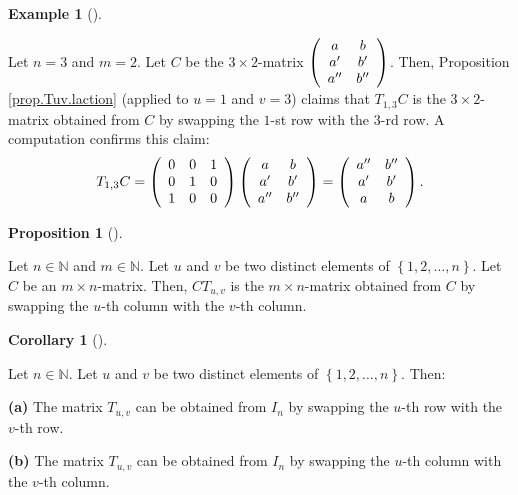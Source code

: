 \documentclass[numbers=enddot,12pt,final,onecolumn,notitlepage]{scrartcl}%
\theoremstyle{definition}
\newtheorem{prop}[theo]{Proposition}
\newenvironment{proposition}[1][]
{\begin{prop}[#1]\begin{leftbar}}
{\end{leftbar}\end{prop}}
\newtheorem{coro}[theo]{Corollary}
\newenvironment{corollary}[1][]
{\begin{coro}[#1]\begin{leftbar}}
{\end{leftbar}\end{coro}}
\newtheorem{exam}[theo]{Example}
\newenvironment{example}[1][]
{\begin{exam}[#1]\begin{leftbar}}
{\end{leftbar}\end{exam}}
\begin{document}
\begin{example}
\label{exam.prop.Tuv.laction}Let $n=3$ and $m=2$. Let $C$ be the $3\times
2$-matrix $\left(
\begin{array}
[c]{cc}%
a & b\\
a^{\prime} & b^{\prime}\\
a^{\prime\prime} & b^{\prime\prime}%
\end{array}
\right)  $. Then, Proposition \ref{prop.Tuv.laction} (applied to $u=1$ and
$v=3$) claims that $T_{1,3}C$ is the $3\times2$-matrix obtained from $C$ by
swapping the $1$-st row with the $3$-rd row. A computation confirms this
claim:%
\[
T_{1,3}C=\left(
\begin{array}
[c]{ccc}%
0 & 0 & 1\\
0 & 1 & 0\\
1 & 0 & 0
\end{array}
\right)  \left(
\begin{array}
[c]{cc}%
a & b\\
a^{\prime} & b^{\prime}\\
a^{\prime\prime} & b^{\prime\prime}%
\end{array}
\right)  =\left(
\begin{array}
[c]{cc}%
a^{\prime\prime} & b^{\prime\prime}\\
a^{\prime} & b^{\prime}\\
a & b
\end{array}
\right)  .
\]

\end{example}

\begin{proposition}
\label{prop.Tuv.raction}Let $n\in\mathbb{N}$ and $m\in\mathbb{N}$. Let $u$ and
$v$ be two distinct elements of $\left\{  1,2,\ldots,n\right\}  $. Let $C$ be
an $m\times n$-matrix. Then, $CT_{u,v}$ is the $m\times n$-matrix obtained
from $C$ by swapping the $u$-th column with the $v$-th column.
\end{proposition}

\begin{corollary}
\label{cor.Tuv.as-switch}Let $n\in\mathbb{N}$. Let $u$ and $v$ be two distinct
elements of $\left\{  1,2,\ldots,n\right\}  $. Then:

\textbf{(a)} The matrix $T_{u,v}$ can be obtained from $I_{n}$ by swapping the
$u$-th row with the $v$-th row.

\textbf{(b)} The matrix $T_{u,v}$ can be obtained from $I_{n}$ by swapping the
$u$-th column with the $v$-th column.
\end{corollary}
\end{document}
